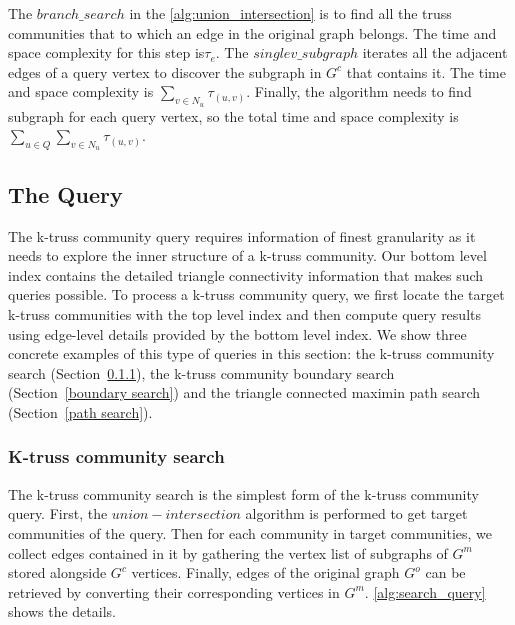 The $branch\_search$ in the \autoref{alg:union_intersection} is to find all the truss communities that to which an edge in the original graph belongs. The time and space complexity for this step is$\tau_e$. The $singlev\_subgraph$ iterates all the adjacent edges of a query vertex to discover the subgraph in $G^c$ that contains it. The time and space complexity is $\sum_{v \in N_u}{\tau_{(u,v)}}$. Finally, the algorithm needs to find subgraph for each query vertex, so the total time and space complexity is $\sum_{u \in Q}{\sum_{v \in N_u}{\tau_{(u,v)}}}$. 

\subsection{The \BottomLevelProb{} Query}
\label{\bottomlevelprob{}}

The \bottomlevelprob{} k-truss community query requires information of finest granularity as it needs to explore the inner structure of a k-truss community. Our bottom level index contains the detailed triangle connectivity information that makes such queries possible. To process a k-truss community query, we first locate the target k-truss communities with the top level index and then compute query results using edge-level details provided by the bottom level index.  We show three concrete examples of this type of queries in this section: the k-truss community search (Section~\ref{k-truss community search}), the k-truss community boundary search (Section~\ref{boundary search}) and the triangle connected maximin path search (Section~\ref{path search}).

\subsubsection{K-truss community search}
\label{k-truss community search}

The k-truss community search is the simplest form of the \bottomlevelprob{} k-truss community query. First, the $union-intersection$ algorithm is performed to get target communities of the query. Then for each community in target communities, we collect edges contained in it by gathering the vertex list of subgraphs of $G^m$ stored alongside $G^c$ vertices. Finally, edges of the original graph $G^o$ can be retrieved by converting their corresponding vertices in $G^m$. \autoref{alg:search_query} shows the details.

